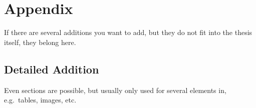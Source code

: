 \chapter{Appendix}

If there are several additions you want to add, but they do not fit into the thesis itself, they belong here.

\section{Detailed Addition}

Even sections are possible, but usually only used for several elements in, e.g.\ tables, images, etc.

